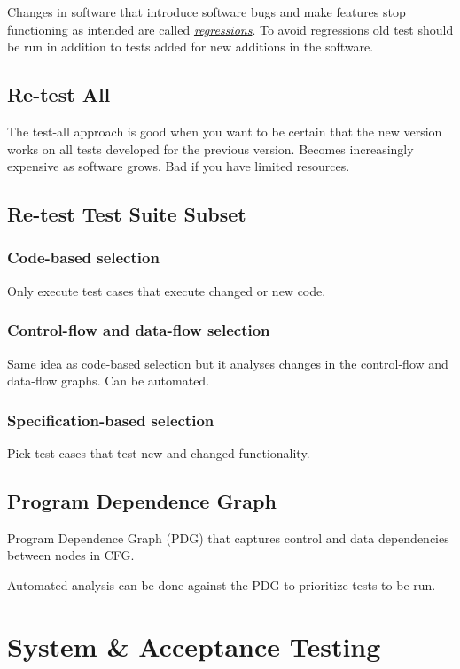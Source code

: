 \documentclass{article}
\begin{document}
Changes in software that introduce software bugs and make features stop functioning as intended are called \textit{\underline{regressions}}. To avoid regressions old test should be run in addition to tests added for new additions in the software.

\subsection{Re-test All}
The test-all approach is good when you want
to be certain that the new version works on all
tests developed for the previous version. Becomes increasingly expensive as software grows. Bad if you have limited resources.

\subsection{Re-test Test Suite Subset}

\subsubsection{Code-based selection}
Only execute test cases that execute changed or new code.

\subsubsection{Control-flow and data-flow selection}
Same idea as code-based selection but it analyses changes in the control-flow and data-flow graphs. Can be automated.

\subsubsection{Specification-based  selection}
Pick test cases that test new and changed
functionality.

\subsection{Program Dependence Graph}

Program Dependence Graph (PDG) that captures control and data dependencies between nodes in CFG.

Automated analysis can be done against the PDG to prioritize tests to be run.

\section{System \& Acceptance Testing}
\end{document}
